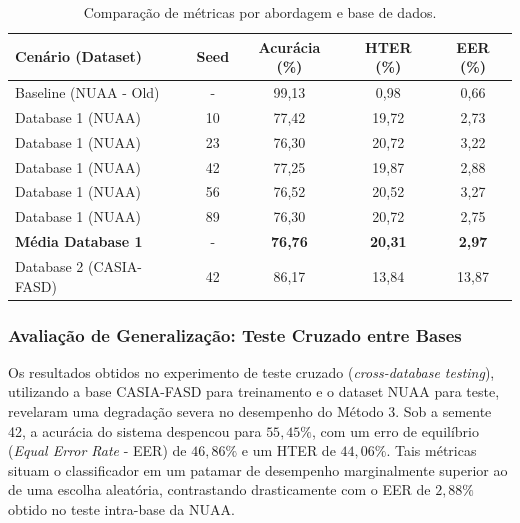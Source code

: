 \documentclass[
	article,			%
	11pt,				%
	oneside,			%
	a4paper,			%
	english,			%
	brazil,				%
	sumario=tradicional
	]{abntex2}
\begin{document}
\begin{table}[h]
\centering
\caption{Comparação de métricas por abordagem e base de dados.}
\label{tab:resultados}
\begin{tabular}{@{}lcccc@{}}
\toprule
\textbf{Cenário (Dataset)} & \textbf{Seed} & \textbf{Acurácia (\%)} & \textbf{HTER (\%)} & \textbf{EER (\%)} \\ \midrule
Baseline (NUAA - Old)      & -             & 99,13                  & 0,98               & 0,66              \\ \midrule
Database 1 (NUAA)          & 10            & 77,42                  & 19,72              & 2,73              \\
Database 1 (NUAA)          & 23            & 76,30                  & 20,72              & 3,22              \\
Database 1 (NUAA)          & 42            & 77,25                  & 19,87              & 2,88              \\
Database 1 (NUAA)          & 56            & 76,52                  & 20,52              & 3,27              \\
Database 1 (NUAA)          & 89            & 76,30                  & 20,72              & 2,75              \\ \midrule
\textbf{Média Database 1}  & -             & \textbf{76,76}         & \textbf{20,31}     & \textbf{2,97}     \\ \midrule
Database 2 (CASIA-FASD)    & 42            & 86,17                  & 13,84              & 13,87             \\ \bottomrule
\end{tabular}
\end{table}

\subsubsection{Avaliação de Generalização: Teste Cruzado entre Bases}

Os resultados obtidos no experimento de teste cruzado (\textit{cross-database testing}), utilizando a base CASIA-FASD para treinamento e o dataset NUAA para teste, revelaram uma degradação severa no desempenho do Método 3. Sob a semente 42, a acurácia do sistema despencou para $55,45\%$, com um erro de equilíbrio (\textit{Equal Error Rate} - EER) de $46,86\%$ e um HTER de $44,06\%$. Tais métricas situam o classificador em um patamar de desempenho marginalmente superior ao de uma escolha aleatória, contrastando drasticamente com o EER de $2,88\%$ obtido no teste intra-base da NUAA.
\end{document}
